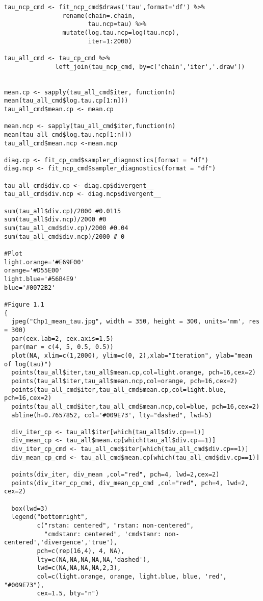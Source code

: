 \begin{verbatim}
tau_ncp_cmd <- fit_ncp_cmd$draws('tau',format='df') %>% 
                rename(chain=.chain,
                       tau.ncp=tau) %>% 
                mutate(log.tau.ncp=log(tau.ncp),
                       iter=1:2000)

tau_all_cmd <- tau_cp_cmd %>% 
              left_join(tau_ncp_cmd, by=c('chain','iter','.draw'))


mean.cp <- sapply(tau_all_cmd$iter, function(n) mean(tau_all_cmd$log.tau.cp[1:n]))
tau_all_cmd$mean.cp <- mean.cp

mean.ncp <- sapply(tau_all_cmd$iter,function(n) mean(tau_all_cmd$log.tau.ncp[1:n]))
tau_all_cmd$mean.ncp <-mean.ncp

diag.cp <- fit_cp_cmd$sampler_diagnostics(format = "df")
diag.ncp <- fit_ncp_cmd$sampler_diagnostics(format = "df")

tau_all_cmd$div.cp <- diag.cp$divergent__
tau_all_cmd$div.ncp <- diag.ncp$divergent__

sum(tau_all$div.cp)/2000 #0.0115
sum(tau_all$div.ncp)/2000 #0
sum(tau_all_cmd$div.cp)/2000 #0.04
sum(tau_all_cmd$div.ncp)/2000 # 0

#Plot
light.orange='#E69F00'
orange='#D55E00'
light.blue='#56B4E9'
blue='#0072B2'

#Figure 1.1
{
  jpeg("Chp1_mean_tau.jpg", width = 350, height = 300, units='mm', res = 300)
  par(cex.lab=2, cex.axis=1.5)
  par(mar = c(4, 5, 0.5, 0.5))
  plot(NA, xlim=c(1,2000), ylim=c(0, 2),xlab="Iteration", ylab="mean of log(tau)")
  points(tau_all$iter,tau_all$mean.cp,col=light.orange, pch=16,cex=2)
  points(tau_all$iter,tau_all$mean.ncp,col=orange, pch=16,cex=2)
  points(tau_all_cmd$iter,tau_all_cmd$mean.cp,col=light.blue, pch=16,cex=2)
  points(tau_all_cmd$iter,tau_all_cmd$mean.ncp,col=blue, pch=16,cex=2)
  abline(h=0.7657852, col='#009E73', lty="dashed", lwd=5)
  
  div_iter_cp <- tau_all$iter[which(tau_all$div.cp==1)]
  div_mean_cp <- tau_all$mean.cp[which(tau_all$div.cp==1)]
  div_iter_cp_cmd <- tau_all_cmd$iter[which(tau_all_cmd$div.cp==1)]
  div_mean_cp_cmd <- tau_all_cmd$mean.cp[which(tau_all_cmd$div.cp==1)]
  
  points(div_iter, div_mean ,col="red", pch=4, lwd=2,cex=2)
  points(div_iter_cp_cmd, div_mean_cp_cmd ,col="red", pch=4, lwd=2, cex=2)
  
  box(lwd=3)
  legend("bottomright",
         c("rstan: centered", "rstan: non-centered", 
           "cmdstanr: centered", 'cmdstanr: non-centered','divergence','true'),
         pch=c(rep(16,4), 4, NA), 
         lty=c(NA,NA,NA,NA,NA,'dashed'), 
         lwd=c(NA,NA,NA,NA,2,3),
         col=c(light.orange, orange, light.blue, blue, 'red', "#009E73"),
         cex=1.5, bty="n")
  

\end{verbatim}
